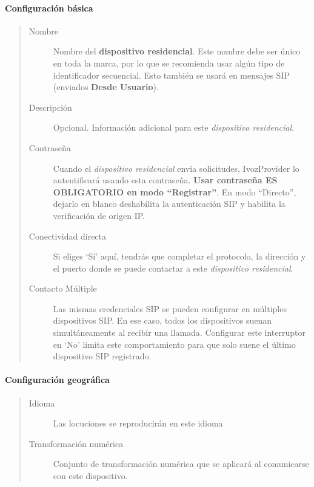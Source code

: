 \documentclass[letterpaper,10pt,spanish]{sphinxmanual}
\begin{document}
\paragraph{Configuración básica}
\label{administration_portal/client/residential/residential_devices:basic-configuration}\begin{quote}
\begin{description}
\item[{Nombre}] \leavevmode
Nombre del \textbf{dispositivo residencial}. Este nombre debe ser único en toda la marca, por lo que se recomienda usar algún tipo de identificador secuencial. Esto también se usará en mensajes SIP (enviados \textbf{Desde Usuario}).

\item[{Descripción}] \leavevmode
Opcional. Información adicional para este \emph{dispositivo residencial}.

\item[{Contraseña}] \leavevmode
Cuando el \emph{dispositivo residencial} envía solicitudes, IvozProvider lo autentificará usando esta contraseña. \textbf{Usar contraseña ES OBLIGATORIO en modo ``Registrar''}. En modo ``Directo'', dejarlo en blanco deshabilita la autenticación SIP y habilita la verificación de origen IP.

\item[{Conectividad directa}] \leavevmode
Si eliges `Sí' aquí, tendrás que completar el protocolo, la dirección y el puerto donde se puede contactar a este \emph{dispositivo residencial}.

\item[{Contacto Múltiple}] \leavevmode
Las mismas credenciales SIP se pueden configurar en múltiples dispositivos SIP. En ese caso, todos los dispositivos suenan simultáneamente al recibir una llamada. Configurar este interruptor en `No' limita este comportamiento para que solo suene el último dispositivo SIP registrado.

\end{description}
\end{quote}


\paragraph{Configuración geográfica}
\label{administration_portal/client/residential/residential_devices:geographic-configuration}\begin{quote}
\begin{description}
\item[{Idioma}] \leavevmode
Las locuciones se reproducirán en este idioma

\item[{Transformación numérica}] \leavevmode
Conjunto de transformación numérica que se aplicará al comunicarse con este dispositivo.

\end{description}
\end{quote}
\end{document}

